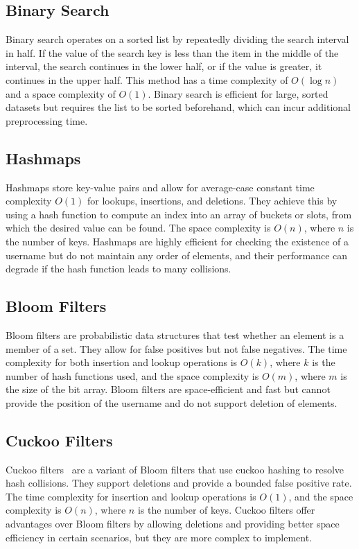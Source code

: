 \documentclass[acmsmall,screen, nonacm]{acmart}
\begin{document}
\subsection{Binary Search}
Binary search operates on a sorted list by repeatedly dividing the search interval in half.
If the value of the search key is less than the item in the middle of the interval, the search continues in the lower half, or if the value is greater, it continues in the upper half.
This method has a time complexity of \(O(\log n)\) and a space complexity of \(O(1)\).
Binary search is efficient for large, sorted datasets but requires the list to be sorted beforehand, which can incur additional preprocessing time.

\subsection{Hashmaps}
Hashmaps store key-value pairs and allow for average-case constant time complexity \(O(1)\) for lookups, insertions, and deletions.
They achieve this by using a hash function to compute an index into an array of buckets or slots, from which the desired value can be found.
The space complexity is \(O(n)\), where \(n\) is the number of keys.
Hashmaps are highly efficient for checking the existence of a username but do not maintain any order of elements, and their performance can degrade if the hash function leads to many collisions.

\subsection{Bloom Filters}
Bloom filters are probabilistic data structures that test whether an element is a member of a set.
They allow for false positives but not false negatives.
The time complexity for both insertion and lookup operations is \(O(k)\), where \(k\) is the number of hash functions used, and the space complexity is \(O(m)\), where \(m\) is the size of the bit array.
Bloom filters are space-efficient and fast but cannot provide the position of the username and do not support deletion of elements.

\subsection{Cuckoo Filters}
Cuckoo filters~\cite{fan2014Cuckoo} are a variant of Bloom filters that use cuckoo hashing to resolve hash collisions.
They support deletions and provide a bounded false positive rate.
The time complexity for insertion and lookup operations is \(O(1)\), and the space complexity is \(O(n)\), where \(n\) is the number of keys.
Cuckoo filters offer advantages over Bloom filters by allowing deletions and providing better space efficiency in certain scenarios, but they are more complex to implement.
\end{document}
